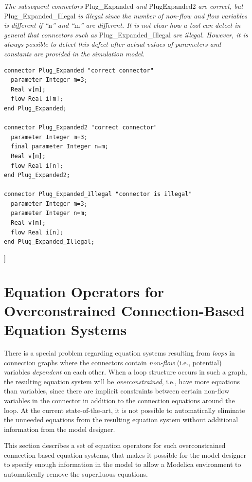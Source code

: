 \documentclass[10pt,a4paper]{report}
\def\doublelabel#1{\label{#1}}
\begin{document}
\emph{The subsequent connectors} Plug\_Expanded \emph{and} PlugExpanded2
\emph{are correct, but} Plug\_Expanded\_Illegal \emph{is illegal since
the number of non-flow and flow variables is different if ``}n\emph{''
and ``}m\emph{'' are different. It is not clear how a tool can detect in
general that connectors such as} Plug\_Expanded\_Illegal \emph{are
illegal. However, it is always possible to detect this defect after
actual values of parameters and constants are provided in the simulation
model.}

\begin{lstlisting}[language=modelica]
connector Plug_Expanded "correct connector"
  parameter Integer m=3;
  Real v[m];
  flow Real i[m];
end Plug_Expanded;

connector Plug_Expanded2 "correct connector"
  parameter Integer m=3;
  final parameter Integer n=m;
  Real v[m];
  flow Real i[n];
end Plug_Expanded2;

connector Plug_Expanded_Illegal "connector is illegal"
  parameter Integer m=3;
  parameter Integer n=m;
  Real v[m];
  flow Real i[n];
end Plug_Expanded_Illegal;
\end{lstlisting}

{]}

\section{Equation Operators for Overconstrained Connection-Based Equation Systems}\doublelabel{equation-operators-for-overconstrained-connection-based-equation-systems1}

There is a special problem regarding equation systems resulting from
\emph{loops} in connection graphs where the connectors contain
\emph{non-flow} (i.e., potential) variables \emph{dependent} on each
other. When a loop structure occurs in such a graph, the resulting
equation system will be \emph{overconstrained}, i.e., have more
equations than variables, since there are implicit constraints between
certain non-flow variables in the connector in addition to the
connection equations around the loop. At the current state-of-the-art,
it is not possible to automatically eliminate the unneeded equations
from the resulting equation system without additional information from
the model designer.

This section describes a set of equation operators for such
overconstrained connection-based equation systems, that makes it
possible for the model designer to specify enough information in the
model to allow a Modelica environment to automatically remove the
superfluous equations.
\end{document}
